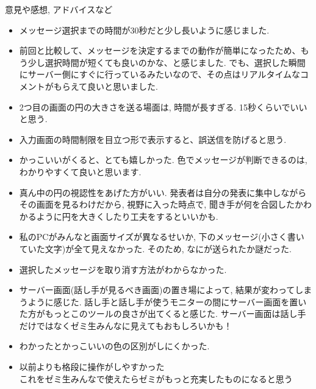 \documentclass{funthesis}
\begin{document}
意見や感想, アドバイスなど\\
\begin{itemize}
\setlength{\itemsep}{-0.5mm} %
  \setlength{\parskip}{-0.5mm} %
 \item メッセージ選択までの時間が30秒だと少し長いように感じました.\\
 \item 前回と比較して、メッセージを決定するまでの動作が簡単になったため、もう少し選択時間が短くても良いのかな、と感じました. でも、選択した瞬間にサーバー側にすぐに行っているみたいなので、その点はリアルタイムなコメントがもらえて良いと思いました.\\
 \item 2つ目の画面の円の大きさを送る場面は, 時間が長すぎる. 15秒くらいでいいと思う.\\
 \item 入力画面の時間制限を目立つ形で表示すると、誤送信を防げると思う.\\
 \item かっこいいがくると、とても嬉しかった. 色でメッセージが判断できるのは, わかりやすくて良いと思います.\\
 \item 真ん中の円の視認性をあげた方がいい. 発表者は自分の発表に集中しながらその画面を見るわけだから, 視野に入った時点で, 聞き手が何を合図したかわかるように円を大きくしたり工夫をするといいかも.\\
 \item 私のPCがみんなと画面サイズが異なるせいか, 下のメッセージ(小さく書いていた文字)が全て見えなかった. そのため, なにが送られたか謎だった. \\
 \item 選択したメッセージを取り消す方法がわからなかった. 
 \item サーバー画面(話し手が見るべき画面)の置き場によって, 結果が変わってしまうように感じた. 話し手と話し手が使うモニターの間にサーバー画面を置いた方がもっとこのツールの良さが出てくると感じた. サーバー画面は話し手だけではなくゼミ生みんなに見えてもおもしろいかも！\\
 \item わかったとかっこいいの色の区別がしにくかった.\\
 \item 以前よりも格段に操作がしやすかった\\これをゼミ生みんなで使えたらゼミがもっと充実したものになると思う\\

\end{itemize}
\end{document}
